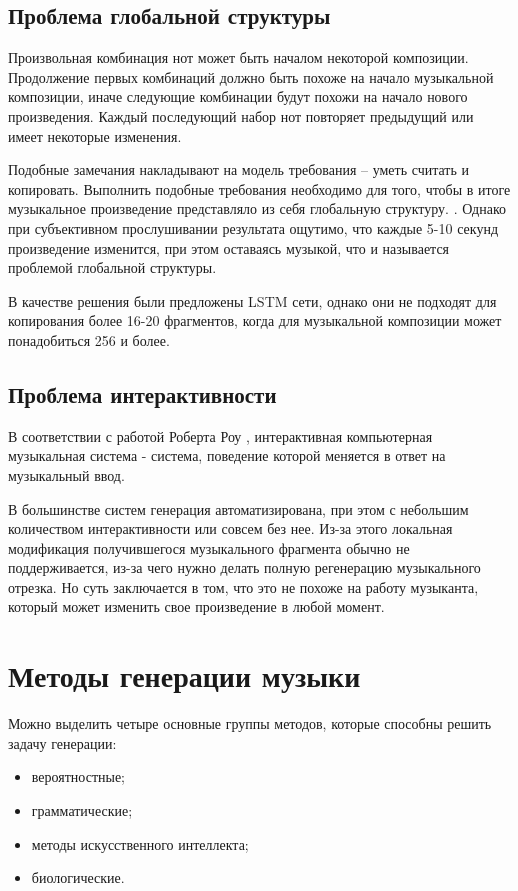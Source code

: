 \subsection{Проблема глобальной структуры}

Произвольная комбинация нот может быть началом некоторой композиции. Продолжение первых комбинаций должно быть похоже на начало музыкальной композиции, иначе следующие комбинации будут похожи на начало нового произведения. Каждый последующий набор нот повторяет предыдущий или имеет некоторые изменения. 

Подобные замечания накладывают на модель требования -- уметь считать и копировать. Выполнить подобные требования необходимо для того, чтобы в итоге музыкальное произведение представляло из себя глобальную структуру. \cite{music-issues}. Однако при субъективном прослушивании результата ощутимо, что каждые 5-10 секунд произведение изменится, при этом оставаясь музыкой, что и называется проблемой глобальной структуры.

В качестве решения были предложены LSTM \cite{lstm} сети, однако они не подходят для копирования более 16-20 фрагментов, когда для музыкальной композиции может понадобиться 256 и более.


\subsection{Проблема интерактивности}

В соответствии с работой Роберта Роу \cite{music-issues}, интерактивная компьютерная музыкальная система - система, поведение которой меняется в ответ на музыкальный ввод.

В большинстве систем генерация автоматизирована, при этом с небольшим количеством интерактивности или совсем без нее. Из-за этого локальная модификация получившегося музыкального фрагмента обычно не поддерживается, из-за чего нужно делать полную регенерацию музыкального отрезка. Но суть заключается в том, что это не похоже на работу музыканта, который может изменить свое произведение в любой момент.


\section{Методы генерации музыки}

Можно выделить четыре основные группы методов, которые способны решить задачу генерации:

\begin{itemize}
    \item вероятностные;
    \item грамматические;
    \item методы искусственного интеллекта;
    \item биологические.
\end{itemize}


